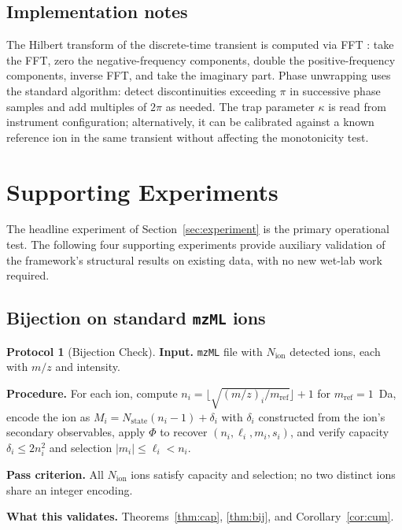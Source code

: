 \documentclass[twocolumn,10pt,a4paper]{article}
\theoremstyle{thmstyle}
\theoremstyle{definition}
\newtheorem{protocol}[theorem]{Protocol}
\theoremstyle{remark}
\newcommand{\PhiMap}{\varPhi}
\begin{document}
\subsection{Implementation notes}

The Hilbert transform of the discrete-time transient is computed via
FFT \citep{cooley1965}: take the FFT, zero the negative-frequency
components, double the positive-frequency components, inverse FFT,
and take the imaginary part. Phase unwrapping uses the standard
algorithm: detect discontinuities exceeding $\pi$ in successive phase
samples and add multiples of $2\pi$ as needed. The trap parameter
$\kappa$ is read from instrument configuration; alternatively, it can
be calibrated against a known reference ion in the same transient
without affecting the monotonicity test.

\section{Supporting Experiments}
\label{sec:supporting}

The headline experiment of Section~\ref{sec:experiment} is the
primary operational test. The following four supporting experiments
provide auxiliary validation of the framework's structural results on
existing data, with no new wet-lab work required.

\subsection{Bijection on standard \texttt{mzML} ions}

\begin{protocol}[Bijection Check]
\label{prot:bij}
\textbf{Input.} \texttt{mzML} file with $N_{\mathrm{ion}}$ detected
ions, each with $m/z$ and intensity.

\textbf{Procedure.} For each ion, compute
$n_{i}=\lfloor\sqrt{(m/z)_{i}/m_{\mathrm{ref}}}\rfloor+1$ for
$m_{\mathrm{ref}}=1$~Da, encode the ion as
$M_{i}=N_{\mathrm{state}}(n_{i}-1)+\delta_{i}$ with $\delta_{i}$
constructed from the ion's secondary observables, apply $\PhiMap$ to
recover $(n_{i},\ell_{i},m_{i},s_{i})$, and verify capacity
$\delta_{i}\leq 2n_{i}^{2}$ and selection $|m_{i}|\leq\ell_{i}<n_{i}$.

\textbf{Pass criterion.} All $N_{\mathrm{ion}}$ ions satisfy capacity
and selection; no two distinct ions share an integer encoding.

\textbf{What this validates.} Theorems~\ref{thm:cap}, \ref{thm:bij},
and Corollary~\ref{cor:cum}.
\end{protocol}
\end{document}
